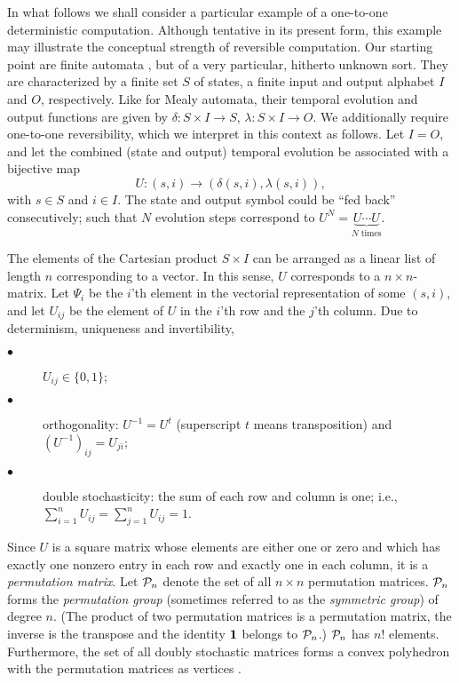 In what follows we shall consider a particular example of a
one-to-one deterministic computation.  Although tentative in its present
form, this example may illustrate the conceptual strength of reversible
computation.  Our starting point are
finite automata \cite{e-f-moore,conway,brauer-84,schaller-96,cal-sv-yu},
but of a very particular,
hitherto unknown sort.  They are characterized by a finite set $S$ of
states, a finite input and output alphabet $I$ and $O$, respectively.
Like for Mealy automata, their temporal evolution and output functions
are given by $\delta :S\times I\rightarrow S$, $\lambda :S\times
I\rightarrow O$.  We additionally require one-to-one reversibility,
which we interpret in this context as follows.  Let $I=O$, and let the
combined (state and output) temporal evolution be associated with a
bijective map
\begin{equation}
U:(s,i)\rightarrow (\delta(s,i),\lambda (s,i)),
\label{t-e-l}
\end{equation}
with
$s\in S$ and $i\in I$.
The state and output symbol could be ``fed back'' consecutively; such
that
$N$ evolution steps correspond to $U^N=\underbrace{U\cdots U}_{N
\;\textrm{times}}$.

The elements of the Cartesian product
$S\times I$ can be arranged as a linear list of length
$n$ corresponding to  a vector. In this sense,
$U$ corresponds to a $n\times n$-matrix.  Let $\Psi_i$
be the $i$'th element in the vectorial representation of some
$(s,i)$, and let
$U_{ij}$ be the element
of
$U$ in the $i$'th row and the $j$'th column.
Due to
determinism, uniqueness and invertibility,
\begin{description}
\item[$\bullet$]
$U_{ij}\in \{0,1\}$;
\item[$\bullet$]
orthogonality:
 $U^{-1}=U^t$ (superscript $t$ means transposition) and
$(U^{-1})_{ij}=U_{ji}$;
\item[$\bullet$]
double stochasticity:
the sum of each row and column is one; i.e.,
$\sum_{i=1}^n U_{ij}= \sum_{j=1}^n U_{ij}=1$.
\end{description}
Since $U$ is a square matrix whose elements are either one or zero and
which has exactly one nonzero entry in each row and exactly one in each
column, it is a {\em permutation matrix}.
Let ${\cal P}_n$ denote the set of all $n\times n$ permutation matrices.
 ${\cal P}_n$ forms the {\em permutation group} (sometimes referred to
as the
{\em symmetric group}) of degree $n$. (The product of two permutation
matrices is
a permutation matrix, the inverse is the transpose and the identity
${\bf
1}$ belongs to  ${\cal P}_n$.)
${\cal P}_n$ has $n!$ elements.
Furthermore, the set of all doubly stochastic matrices forms a convex
polyhedron with the permutation matrices as vertices
\cite[page 82]{ber-ple}.

